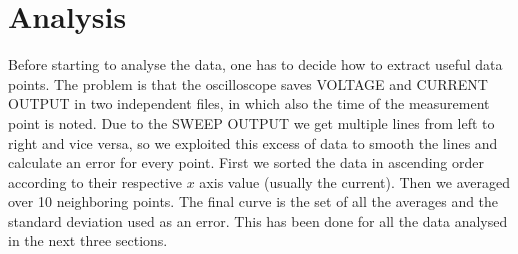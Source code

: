 \documentclass[a4paper,10pt]{article}
\begin{document}
\section{Analysis}
Before starting to analyse the data, one has to decide how to extract useful data points. The problem is that the oscilloscope saves VOLTAGE and CURRENT OUTPUT in two independent files, in which also the time of the measurement point is noted. Due to the SWEEP OUTPUT we get multiple lines from left to right and vice versa, so we exploited this excess of data to smooth the lines and calculate an error for every point. First we sorted the data in ascending order according to their respective $x$ axis value (usually the current). Then we averaged over 10 neighboring points. The final curve is the set of all the averages and the standard deviation used as an error. This has been done for all the data analysed in the next three sections.
\end{document}
